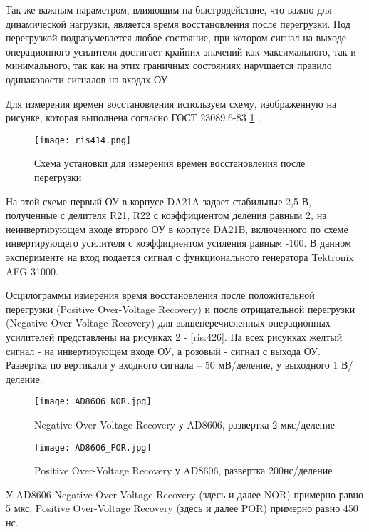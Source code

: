 Так же важным параметром, влияющим на быстродействие, что важно для динамической нагрузки, является 
время восстановления после перегрузки. Под перегрузкой подразумевается  любое состояние, при котором 
сигнал на выходе операционного усилителя достигает крайних значений как максимального, так и минимального,
так как на этих граничных состояниях нарушается правило одинаковости сигналов на входах ОУ \cite{Chopper:OU}.

Для измерения времен восстановления используем схему, изображенную на рисунке, которая выполнена согласно
ГОСТ 23089.6-83 \ref{ris:414} \cite{GOST 23089.6-83}.

\begin{figure}[H]
\centering
\texttt{[image: ris414.png]}
\caption{Схема установки для измерения времен восстановления после перегрузки}
\label{ris:414}
\end{figure}

На этой схеме первый ОУ в корпусе DA21A задает стабильные 2,5 В, полученные с делителя R21, R22 с 
коэффициентом деления равным 2, на неинвертирующем входе второго ОУ в корпусе DA21B, включенного по схеме
инвертирующего усилителя с коэффициентом усиления равным -100. В данном эксперименте на вход подается 
сигнал с функционального генератора Tektronix AFG 31000.


Осцилограммы измерения время восстановления после положительной перегрузки (Positive Over-Voltage Recovery) 
и после отрицательной перегрузки (Negative Over-Voltage Recovery) для вышеперечисленных операционных усилителей
представлены на рисунках \ref{ris:415} - \ref{ris:426}. На всех рисунках желтый сигнал - на инвертирующем 
входе ОУ, а розовый - сигнал с выхода ОУ. Развертка по вертикали у входного сигнала -- 50 мВ/деление, 
у выходного 1 В/деление. 

\begin{figure}[H]
\centering
\texttt{[image: AD8606\_NOR.jpg]}
\caption{Negative Over-Voltage Recovery у AD8606, развертка 2 мкс/деление}
\label{ris:415}
\end{figure}

\begin{figure}[H]
\centering
\texttt{[image: AD8606\_POR.jpg]}
\caption{Positive Over-Voltage Recovery у AD8606, развертка 200нс/деление}
\label{ris:416}
\end{figure}

У AD8606 Negative Over-Voltage Recovery (здесь и далее NOR) примерно равно 5 мкс,
 Positive Over-Voltage Recovery (здесь и далее POR) примерно равно 450 нс.

